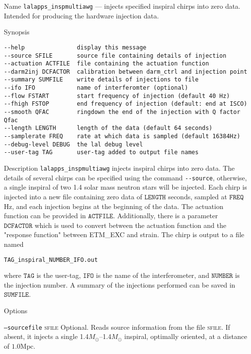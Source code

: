 \begin{entry}
\item[Name]
\verb$lalapps_inspmultiawg$ --- injects specified inspiral chirps into zero
data.  Intended for producing the hardware injection data.

\item[Synopsis]
\begin{verbatim}
--help               display this message
--source SFILE       source file containing details of injection
--actuation ACTFILE  file containing the actuation function
--darm2inj DCFACTOR  calibration between darm_ctrl and injection point
--summary SUMFILE    write details of injections to file
--ifo IFO            name of interferomter (optional)
--flow FSTART        start frequency of injection (default 40 Hz)
--fhigh FSTOP        end frequency of injection (default: end at ISCO)
--smooth QFAC        ringdown the end of the injection with Q factor Qfac
--length LENGTH      length of the data (default 64 seconds)
--samplerate FREQ    rate at which data is sampled (default 16384Hz)
--debug-level DEBUG  the lal debug level
--user-tag TAG       user-tag added to output file names
\end{verbatim}

\item[Description] 
\verb$lalapps_inspmultiawg$ injects inspiral chirps into zero data.  The 
details of several chirps can be specified using the command \verb$--source$,  
otherwise, a single inspiral of two 1.4 solar mass neutron stars will be 
injected.  Each chirp is injected into a new file containing zero data of
$\texttt{LENGTH}$ seconds, sampled at $\texttt{FREQ}$ Hz, and each injection begins at the beginning of the data.  The actuation function can be provided in
$\texttt{ACTFILE}$.  Additionally, there is a parameter $\texttt{DCFACTOR}$ 
which is used to convert between the actuation function and the "response 
function" between ETM\_EXC and strain.  The chirp is output to a file
named
\begin{verbatim}
TAG_inspiral_NUMBER_IFO.out
\end{verbatim}
where $\texttt{TAG}$ is the user-tag, $\texttt{IFO}$ is the name of the 
interferometer, and $\texttt{NUMBER}$ is the injection number.  A summary of
the injections performed can be saved in $\texttt{SUMFILE}$.

\item[Options]\leavevmode
\begin{entry}
\item[\texttt{--sourcefile} \textsc{sfile}] Optional.  Reads source information 
from the file \textsc{sfile}.  If absent, it injects a single 
1.4$M_\odot$--1.4$M_\odot$ inspiral, optimally oriented, at a distance
of $1.0 \textrm{Mpc}$.


\end{entry}
\end{entry}
